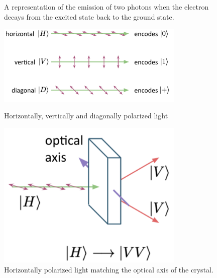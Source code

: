 \begin{figure}[H]
\begin{minipage}[b]{0.3\textwidth}
    \caption{A representation of the emission of two photons when the electron decays from the excited state back to the ground state.}
  \end{minipage}
\end{figure}

\begin{figure}[H]
    \centering
    \includegraphics[width=0.8\textwidth]{lesson4/linear_polarization.pdf}
    \label{fig: 1}
    \begin{center}
        \caption{Horizontally, vertically and diagonally polarized light}
    \end{center}
\end{figure}

\begin{figure}[H]
    \centering
    \includegraphics[width=0.8\textwidth]{lesson4/horizontal_optical_axis.pdf}
    \begin{center}
        \caption{Horizontally polarized light matching the optical axis of the crystal.}
    \end{center}
    \label{fig:horizontal-opt-axis}
\end{figure}

